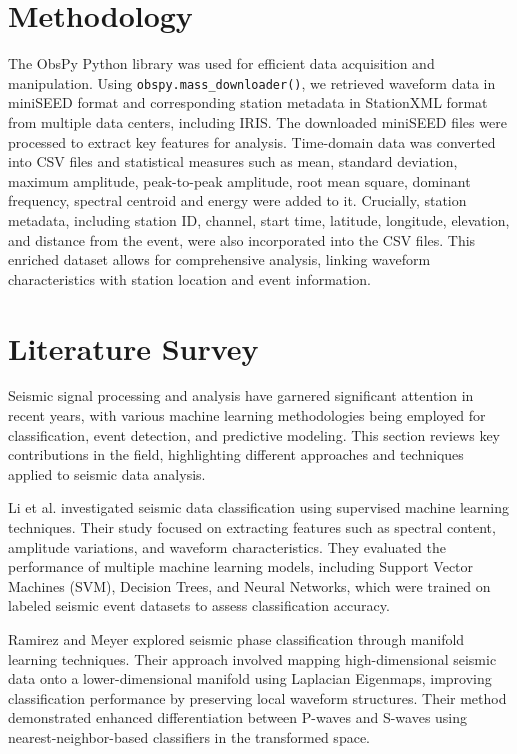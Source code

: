 \documentclass[conference]{IEEEtran}
\begin{document}
\section{Methodology}
\label{sec:orgdc91763}
The ObsPy Python library was used for efficient data acquisition and
manipulation. Using \texttt{obspy.mass\_downloader()}, we retrieved waveform data
in miniSEED format and corresponding station metadata in StationXML format from
multiple data centers, including IRIS. The downloaded miniSEED files were processed to extract key
features for analysis. Time-domain data was converted into CSV files and
statistical measures such as mean, standard deviation, maximum amplitude,
peak-to-peak amplitude, root mean square, dominant frequency, spectral centroid
and energy were added to it. Crucially, station metadata,
including station ID, channel, start time, latitude, longitude, elevation, and
distance from the event, were also incorporated into the CSV files. This
enriched dataset allows for comprehensive analysis, linking waveform
characteristics with station location and event information.
\section{Literature Survey}
\label{sec:orgd5a76b3}
Seismic signal processing and analysis have garnered significant attention in
recent years, with various machine learning methodologies being employed for
classification, event detection, and predictive modeling. This section reviews
key contributions in the field, highlighting different approaches and techniques
applied to seismic data analysis.


Li et al. \cite{b1} investigated seismic data
classification using supervised machine learning techniques. Their study focused
on extracting features such as spectral content, amplitude variations, and
waveform characteristics. They evaluated the performance of multiple machine
learning models, including Support Vector Machines (SVM), Decision Trees, and
Neural Networks, which were trained on labeled seismic event datasets to assess
classification accuracy.


Ramirez and Meyer \cite{b2} explored seismic phase
classification through manifold learning techniques. Their approach involved
mapping high-dimensional seismic data onto a lower-dimensional manifold using
Laplacian Eigenmaps, improving classification performance by preserving local
waveform structures. Their method demonstrated enhanced differentiation between
P-waves and S-waves using nearest-neighbor-based classifiers in the transformed
space.
\end{document}
